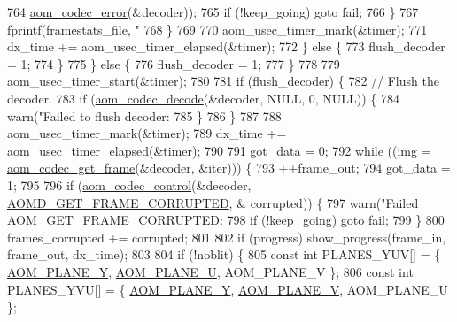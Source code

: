 \begin{DoxyCodeInclude}
{{{{{{{{{{{{{{{{{{{{{{{{{{{{{{{{{{{{{{{{{{764                  \hyperlink{group__codec_ga50949c0854605c722832bbfb0803f5f4}{aom\_codec\_error}(&decoder));
765             \textcolor{keywordflow}{if} (!keep\_going) \textcolor{keywordflow}{goto} fail;
766           \}
767           fprintf(framestats\_file, \textcolor{stringliteral}{"%
768         \}
769 
770         aom\_usec\_timer\_mark(&timer);
771         dx\_time += aom\_usec\_timer\_elapsed(&timer);
772       \} \textcolor{keywordflow}{else} \{
773         flush\_decoder = 1;
774       \}
775     \} \textcolor{keywordflow}{else} \{
776       flush\_decoder = 1;
777     \}
778 
779     aom\_usec\_timer\_start(&timer);
780 
781     \textcolor{keywordflow}{if} (flush\_decoder) \{
782       \textcolor{comment}{// Flush the decoder.}
783       \textcolor{keywordflow}{if} (\hyperlink{group__decoder_gab03fdb999d1f83a5896869a3ba5f68f7}{aom\_codec\_decode}(&decoder, NULL, 0, NULL)) \{
784         warn(\textcolor{stringliteral}{"Failed to flush decoder: %
785       \}
786     \}
787 
788     aom\_usec\_timer\_mark(&timer);
789     dx\_time += aom\_usec\_timer\_elapsed(&timer);
790 
791     got\_data = 0;
792     \textcolor{keywordflow}{while} ((img = \hyperlink{group__decoder_ga780aad27a2728abefab725faa3bc4f79}{aom\_codec\_get\_frame}(&decoder, &iter))) \{
793       ++frame\_out;
794       got\_data = 1;
795 
796       \textcolor{keywordflow}{if} (\hyperlink{group__codec_ga6da974f4eeaba1fa74106b28d0fe6ac5}{aom\_codec\_control}(&decoder, \hyperlink{group__aom__decoder_gga3865fd4b3192489baa9a5c3632ebe97ba159ddb748cb69956226b7c13e3890ff6}{AOMD\_GET\_FRAME\_CORRUPTED}, &
      corrupted)) \{
797         warn(\textcolor{stringliteral}{"Failed AOM\_GET\_FRAME\_CORRUPTED: %
798         \textcolor{keywordflow}{if} (!keep\_going) \textcolor{keywordflow}{goto} fail;
799       \}
800       frames\_corrupted += corrupted;
801 
802       \textcolor{keywordflow}{if} (progress) show\_progress(frame\_in, frame\_out, dx\_time);
803 
804       \textcolor{keywordflow}{if} (!noblit) \{
805         \textcolor{keyword}{const} \textcolor{keywordtype}{int} PLANES\_YUV[] = \{ \hyperlink{aom__image_8h_a2ad22076006b15cf809edcaa33f6d339}{AOM\_PLANE\_Y}, \hyperlink{aom__image_8h_a0845e9194541329c0f77b4bd6a38cc7c}{AOM\_PLANE\_U}, AOM\_PLANE\_V \};
806         \textcolor{keyword}{const} \textcolor{keywordtype}{int} PLANES\_YVU[] = \{ \hyperlink{aom__image_8h_a2ad22076006b15cf809edcaa33f6d339}{AOM\_PLANE\_Y}, \hyperlink{aom__image_8h_a32a43f20adb01d846af1925189c37495}{AOM\_PLANE\_V}, AOM\_PLANE\_U \};
}}}}}}}}}}}}}}}}}}}}}}}}}}}}}}}}}}}}}}}}}}}}}
\end{DoxyCodeInclude}
